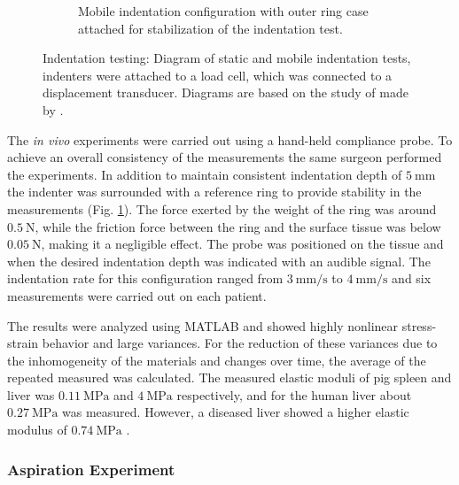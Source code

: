 \begin{figure}
\begin{subfigure}[b]{0.45\textwidth}
        \caption{Mobile indentation configuration with outer ring case attached for stabilization of the indentation test.}
        \label{fig:carter2}
        \end{subfigure}
        \hspace{0.3cm}
        \caption[Indentation setup of synthetic and biological tissues by \citet{Carter2001}]{Indentation testing: Diagram of static and mobile indentation tests, indenters were attached to a load cell, which was connected to a displacement transducer. Diagrams are based on the study of made by \citet{Carter2001}.}
        \label{fig:indentationcarter}
\end{figure}

The \textit{in vivo} experiments were carried out using a hand-held compliance probe. To achieve 
an overall consistency of the measurements the same surgeon performed the experiments. 
In addition to maintain consistent indentation depth of $\SI{5}{\milli \m}$ the indenter was 
surrounded with a reference ring to provide stability in the measurements (Fig. \ref{fig:carter2}). The force 
exerted by the weight of the ring was around $\SI{0.5}{\newton}$, while the friction force 
between the ring and the surface tissue was below $\SI{0.05}{\newton}$, making it a negligible 
effect. The probe was positioned on the tissue and when the desired indentation depth was 
indicated with an audible signal. The indentation rate for this configuration ranged 
from $\SI[per-mode = symbol]{3}{\milli \m\per \second}$ to $\SI[per-mode = symbol]{4}{\milli \m\per \second}$ and 
six measurements were carried out on each patient.

The results were analyzed using MATLAB and showed highly nonlinear stress-strain behavior and large variances. 
For the reduction of these variances due to the inhomogeneity of the materials and changes over time, 
the average of the repeated measured was calculated. The measured elastic moduli of pig 
spleen and liver was $\SI{0.11}{\mega \pascal}$ and $\SI{4}{\mega \pascal}$ respectively, and 
for the human liver about $\SI{0.27}{\mega \pascal}$ was measured. However, a 
diseased liver showed a higher elastic modulus of $\SI{0.74}{\mega \pascal}$ \cite{Carter2001}.
\subsubsection*{Aspiration Experiment}

